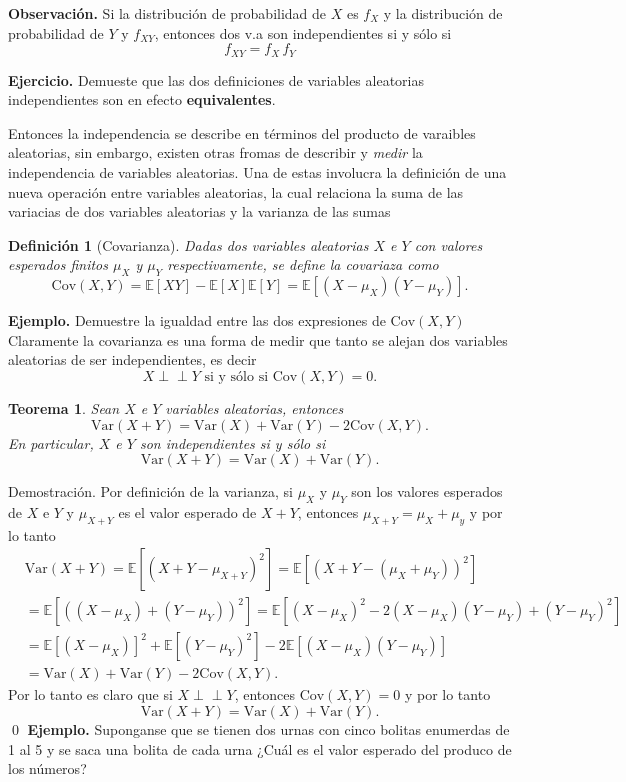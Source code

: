 \documentclass[letterpaper]{book}
\newcommand{\ind}{\perp\!\!\!\!\perp}
\newtheorem{teorema}{Teorema}[section]
\newtheorem{def.}{Definici\'on}[section]
\newcommand{\esp}{\mathbb E}
\newcommand{\eje}{{\newline \noindent \sc \textbf{Ejercicio. }}}
\newcommand{\exe}{{\newline \noindent \sc \textbf{Ejemplo. }}}
\newcommand{\obs}{{\newline \noindent \sc \textbf{Observación. }}}
\newcommand{\dem}{{\noindent \sc Demostraci\'on. }}
\begin{document}
\obs Si la distribución de probabilidad de \(X\) es \(f_X\) y la distribución de probabilidad de \(Y\) y \(f_{XY}\), entonces dos v.a son independientes si y sólo si
\[
f_{XY}=f_X\,f_Y
\]

\eje Demueste que las dos definiciones de variables aleatorias independientes son en efecto \textbf{equivalentes}.

Entonces la independencia se describe en términos del producto de varaibles aleatorias, sin embargo, existen otras fromas de describir y \emph{medir} la independencia de variables aleatorias. Una de estas involucra la definición de una nueva operación entre variables aleatorias, la cual relaciona la suma de las variacias de dos variables aleatorias y la varianza de las sumas

\begin{def.}[Covarianza]
Dadas dos variables aleatorias \(X\) e \(Y\) con valores esperados finitos \(\mu_X\) y \(\mu_Y\) respectivamente, se define la covariaza como
\[
\mathrm{Cov}(X,Y)=\esp[XY]-\esp[X]\esp[Y]=\esp[(X-\mu_X)(Y-\mu_Y)].
\]
\end{def.}
\exe Demuestre la igualdad entre las dos expresiones de \(\mathrm{Cov}(X,Y)\)
\noindent Claramente la covarianza es una forma de medir que tanto se alejan dos variables aleatorias de ser independientes, es decir
\[
X\ind Y\text{ si y sólo si }\mathrm{Cov}(X,Y)=0.
\]
\begin{teorema}
Sean $X$ e $Y$ variables aleatorias, entonces
\begin{equation}
\mathrm{Var}(X+Y)=\mathrm{Var}(X)+\mathrm{Var}(Y)-2\mathrm{Cov}(X,Y).
\end{equation}
En particular, $X$ e $Y$ son independientes si y sólo si 
\begin{equation}
\mathrm{Var}(X+Y)=\mathrm{Var}(X)+\mathrm{Var}(Y).
\end{equation}
\end{teorema}
\dem Por definición de la varianza, si \(\mu_X\) y \(\mu_Y\) son los valores esperados de \(X\) e \(Y\) y \(\mu_{X+Y}\) es el valor esperado de \(X+Y\), entonces \(\mu_{X+Y}=\mu_X+\mu_y\) y por lo tanto
\begin{align*}
&\mathrm{Var}(X+Y)=\esp[(X+Y-\mu_{X+Y})^2]=\esp[(X+Y-(\mu_{X}+\mu_{Y}))^2]\\
&=\esp[((X-\mu_{X})+(Y-\mu_{Y}))^2]=\esp[(X-\mu_X)^2-2(X-\mu_X)(Y-\mu_Y)+(Y-\mu_Y)^2]\\
&=\esp[(X-\mu_X)]^2+\esp[(Y-\mu_Y)^2]-2\esp[(X-\mu_X)(Y-\mu_Y)]\\
&=\mathrm{Var}(X)+\mathrm{Var}(Y)-2\mathrm{Cov}(X,Y).
\end{align*}
Por lo tanto es claro que si \(X\ind Y\), entonces \(\mathrm{Cov}(X,Y)=0\) y por lo tanto
\[
\mathrm{Var}(X+Y)=\mathrm{Var}(X)+\mathrm{Var}(Y).
\]
\qed
\exe Suponganse que se tienen dos urnas con cinco bolitas enumerdas de 1 al 5 y se saca una bolita de cada urna ¿Cuál es el valor esperado del produco de los números?
\end{document}

